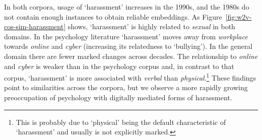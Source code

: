 \documentclass[output=paper]{langsci/langscibook}
\begin{document}
In both corpora, usage of `harassment' increases in the 1990s, and the 1980s do not contain enough instances to obtain reliable embeddings.
As Figure~\ref{fig:w2v-cos-sim-harassment} shows, `harassment' is highly related to \textit{sexual} in both domains.
In the psychology literature `harassment' moves away from \textit{workplace} towards \textit{online} and \textit{cyber} (increasing its relatedness to `bullying'). In the general domain there are fewer marked changes across decades. The relationship to \textit{online} and \textit{cyber} is weaker than in the psychology corpus and, in contrast to that corpus, `harassment' is more associated with \textit{verbal} than \textit{physical}.\footnote{This is probably due to `physical' being the default characteristic of `harassment' and usually is not explicitly marked.} These findings point to similarities across the corpora, but we observe a more rapidly growing preoccupation of psychology with digitally mediated forms of harassment.
\end{document}
